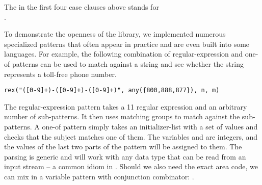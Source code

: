 \noindent
The  in the first four case clauses above stands for \\ %
. %

To demonstrate the openness of the library, we implemented numerous 
specialized patterns that often appear in practice and are even built into some 
languages. For example, the following combination of regular-expression and one-of 
patterns can be used to match against a string and see whether the string 
represents a toll-free phone number. 

\begin{lstlisting}
rex("([0-9]+)-([0-9]+)-([0-9]+)", any({800,888,877}), n, m)
\end{lstlisting}

\noindent
The regular-expression pattern takes a \Cpp{}11 regular expression and an 
arbitrary number of sub-patterns. It then uses matching groups to match against 
the sub-patterns. A one-of pattern simply takes an initializer-list with a set of 
values and checks that the subject matches one of them. The variables 
 and  are integers, and the values of the last two parts of the pattern will be assigned to them. The parsing is generic 
and will work with any data type that can be read from an input stream -- a 
common idiom in \Cpp{}. Should we also need the exact area code, we can mix in a 
variable pattern with conjunction combinator: .


